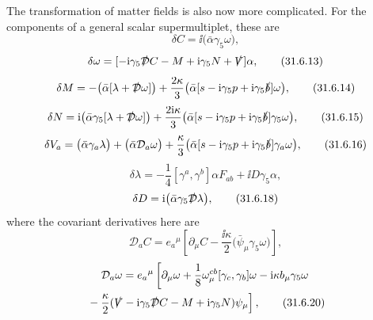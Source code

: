 The transformation of matter fields is also now more complicated. For
the components of a general scalar supermultiplet, these are
\begin{equation}
  \delta C=\ii\bigl(\bar\alpha\gamma_5\omega\bigr),
  \tag{31.6.12}\label{eq:31.6.12}
\end{equation}
\begin{equation}
  \delta\omega
  =[-\mathrm{i}\gamma_5\slashed{\mathcal D}C-M+\mathrm{i}\gamma_5N+\slashed{V}]\alpha,
  \tag{31.6.13}\label{eq:31.6.13}
\end{equation}
\begin{equation}
  \delta M
  =-\bigl(\bar\alpha[\lambda+\slashed{\mathcal D}\omega]\bigr)
  +\frac{2\kappa}{3}
    \bigl(\bar\alpha[s-\mathrm{i}\gamma_5p+\mathrm{i}\gamma_5\slashed{b}]\omega\bigr),
  \tag{31.6.14}\label{eq:31.6.14}
\end{equation}
\begin{equation}
  \delta N
  =\mathrm{i}\bigl(\bar\alpha\gamma_5[\lambda+\slashed{\mathcal D}\omega]\bigr)
  +\frac{2\mathrm{i}\kappa}{3}
    \bigl(\bar\alpha
      [s-\mathrm{i}\gamma_5p+\mathrm{i}\gamma_5\slashed{b}]\gamma_5\omega\bigr),
  \tag{31.6.15}\label{eq:31.6.15}
\end{equation}
\begin{equation}
  \delta V_a
  =\bigl(\bar\alpha\gamma_a\lambda\bigr)
   +\bigl(\bar\alpha\mathcal D_a\omega\bigr)
   +\frac{\kappa}{3}
    \bigl(\bar\alpha
      [s-\mathrm{i}\gamma_5p+\mathrm{i}\gamma_5\slashed{b}]\gamma_a\omega\bigr),
  \tag{31.6.16}\label{eq:31.6.16}
\end{equation}
\begin{equation}
  \delta\lambda
  =-\frac{1}{4}[\gamma^a,\gamma^b]\alpha F_{ab}
   +\ii D\gamma_5\alpha,
  \tag{31.6.17}\label{eq:31.6.17}
\end{equation}
\begin{equation}
  \delta D=\mathrm{i}\bigl(\bar\alpha\gamma_5\slashed{\mathcal D}\lambda\bigr),
  \tag{31.6.18}\label{eq:31.6.18}
\end{equation}
where the covariant derivatives here are
\begin{equation}
  \mathcal D_aC
  =e_a{}^\mu\left[
    \partial_\mu C-\frac{\ii\kappa}{2}
    \bigl(\bar\psi_\mu\gamma_5\omega\bigr)
  \right],
  \tag{31.6.19}\label{eq:31.6.19}
\end{equation}
\begin{multline}
  \mathcal D_a\omega
  =e_a{}^\mu\left[
    \partial_\mu\omega
    +\frac{1}{8}\omega_\mu^{cb}[\gamma_c,\gamma_b]\omega
    -\mathrm{i}\kappa b_\mu\gamma_5\omega\right.\\
  \left.
    {}-\frac{\kappa}{2}
      (\slashed{V}-\mathrm{i}\gamma_5\slashed{\mathcal D}C-M+\mathrm{i}\gamma_5N)\psi_\mu
  \right],
  \tag{31.6.20}\label{eq:31.6.20}
\end{multline}
